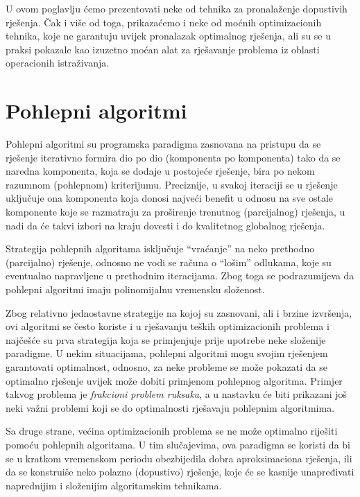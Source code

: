 \documentclass[a4paper, utf8, 11pt, colorlinks]{book}
\begin{document}
 U ovom poglavlju ćemo prezentovati neke od tehnika za pronalaženje dopustivih rješenja. Čak i više od toga, prikazaćemo i neke od moćnih optimizacionih tehnika, koje ne garantuju uvijek pronalazak optimalnog rješenja, ali su se u praksi pokazale kao izuzetno moćan alat za rješavanje problema iz oblasti operacionih istraživanja.
 

\section{Pohlepni algoritmi}
 
Pohlepni algoritmi su programska paradigma zasnovana na pristupu da se  rješenje iterativno formira dio po dio (komponenta po komponenta) tako da se naredna komponenta, koja se dodaje u postojeće rješenje, bira 
 po nekom razumnom (pohlepnom) kriterijumu. Preciznije, u svakoj iteraciji se u rješenje uključuje ona komponenta koja donosi najveći benefit u odnosu na sve ostale komponente koje se razmatraju za proširenje  trenutnog (parcijalnog) rješenja, u nadi da će takvi izbori na kraju dovesti i do kvalitetnog globalnog rješenja.
 
 
 Strategija pohlepnih algoritama isključuje ``vraćanje'' na neko prethodno (parcijalno) rješenje, odnosno ne vodi se računa o ``lošim'' odlukama, koje su eventualno napravljene u prethodnim iteracijama. Zbog toga se podrazumijeva da pohlepni algoritmi imaju polinomijalnu vremensku složenost.
 
 Zbog relativno jednostavne strategije na kojoj su zasnovani, ali i brzine izvršenja, ovi algoritmi se često koriste i u rješavanju teških optimizacionih problema i najčešće su prva strategija koja se primjenjuje prije 
upotrebe neke složenije paradigme. 
U nekim situacijama, pohlepni algoritmi mogu svojim rješenjem garantovati optimalnost, odnosno, za neke probleme se može pokazati da se optimalno rješenje uvijek može dobiti primjenom pohlepnog algoritma. Primjer takvog problema je \emph{frakcioni problem ruksaka}, a u nastavku će biti prikazani još neki važni problemi koji se do optimalnosti rješavaju pohlepnim algoritmima.
 
Sa druge strane, većina optimizacionih problema se ne može optimalno riješiti pomoću pohlepnih algoritama. U tim slučajevima, ova paradigma se koristi da bi se u kratkom vremenskom periodu obezbijedila dobra aproksimaciona rješenja, ili da se konstruiše neko polazno (dopustivo) rješenje, koje će se kasnije unapređivati naprednijim i složenijim algoritamskim tehnikama. 
\end{document}
